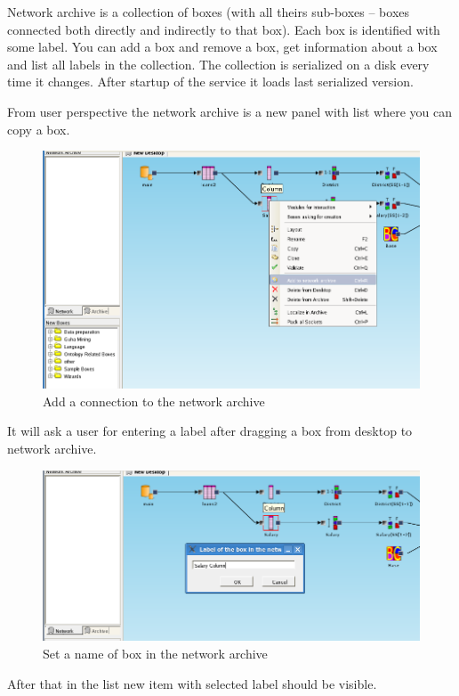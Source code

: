 \documentclass[a4paper,12pt]{book}
\begin{document}
Network archive is a collection of boxes (with all theirs sub-boxes -- boxes connected both directly and indirectly to that box). Each box is identified with some label. You can add a box and remove a box, get information about a box and list all labels in the collection. The collection is serialized on a disk every time it changes. After startup of the service it loads last serialized version.

From user perspective the network archive is a new panel with list where you can copy a box.
\begin{figure}
	\includegraphics[width=13.72cm]{add_to_network_archive}
	\caption{Add a connection to the network archive}
\end{figure}
It will ask a user for entering a label after dragging a box from desktop to network archive.
\begin{figure}
	\includegraphics[width=13.72cm]{set_name_of_box_in_network_archive}
	\caption{Set a name of box in the network archive}
\end{figure}
After that in the list new item with selected label should be visible.
\end{document}
